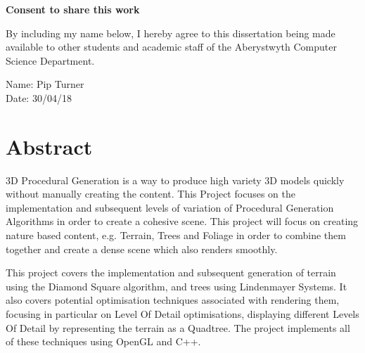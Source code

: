 \documentclass[a4paper,10pt]{report}
\begin{document}
\vspace{1em}
\begin{center}
    {\LARGE\bf Consent to share this work}
\end{center}

By including my name below, I hereby agree to this dissertation being made available to other students and academic staff of the Aberystwyth Computer Science Department.  

\vspace{2em}
Name: Pip Turner  \\

\vspace{1em}
Date: 30/04/18 \\

\setlength{\headheight}{20.2pt}
\pagestyle{fancy}
\setlength{\headsep}{0.2in}
\fancyhf{}

\fancyhead[L]{\leftmark}
\fancyhead[R]{\rightmark}

\fancyfoot[C]{\thepage}

\listoffigures
\listoftables

\tableofcontents
\clearpage

\section{Abstract}
3D Procedural Generation is a way to produce high variety 3D models quickly without manually creating the content. This Project focuses on the implementation and subsequent levels of variation of Procedural Generation Algorithms in order to create a cohesive scene. This project will focus on creating nature based content, e.g. Terrain, Trees and Foliage in order to combine them together and create a dense scene which also renders smoothly. \medskip

This project covers the implementation and subsequent generation of terrain using the Diamond Square algorithm, and trees using Lindenmayer Systems. It also covers potential optimisation techniques associated with rendering them, focusing in particular on Level Of Detail optimisations, displaying different Levels Of Detail by representing the terrain as a Quadtree. The project implements all of these techniques using OpenGL and C++. \medskip
\end{document}
